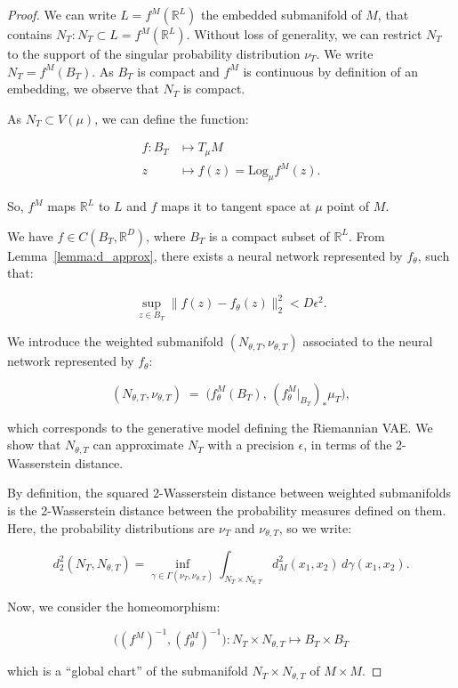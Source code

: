 \documentclass{article}
\begin{document}
\begin{proof}
We can write $L = f^M(\mathbb{R}^L)$ the embedded submanifold of $M$, that contains $N_T: N_T \subset L = f^M(\mathbb{R}^L)$.
Without loss of generality, we can restrict $N_T$ to the support of the singular probability distribution $\nu_T$.
We write $N_T = f^M(B_T)$. As $B_T$ is compact and $f^M$ is continuous by definition of an embedding, we observe that
$N_T$ is compact.

As $N_T\subset V(\mu)$, we can define the function:

\[
\begin{aligned}
f\colon B_T &\mapsto T_\mu M\\
z &\mapsto f(z) = \mathrm{Log}_\mu f^M(z).
\end{aligned}
\]


So, $f^M$ maps $\mathbb{R}^L$ to $L$ and $f$ maps it to tangent space at $\mu$ point of $M$.

We have $f \in C(B_T,\mathbb{R}^D)$, where $B_T$ is a compact subset of $\mathbb{R}^L$. From Lemma~\ref{lemma:d_approx}, there exists 
a neural network represented by $f_\theta$, such that:

\[
\sup_{z \in B_T} \| f(z) - f_\theta(z) \|_2^2 < D\epsilon^2.
\]

We introduce the weighted submanifold $(N_{\theta,T},\nu_{\theta,T})$ associated to the neural network 
represented by $f_\theta$:

\[
(N_{\theta,T},\nu_{\theta,T}) \;=\;\bigl(f^M_\theta(B_T),\, (f^M_{\theta}|_{B_T})_* \mu_T\bigr),
\]

which corresponds to the generative model defining the Riemannian VAE. We show that $N_{\theta,T}$ can approximate $N_T$
with a precision $\epsilon$, in terms of the 2-Wasserstein distance.

By definition, the squared 2-Wasserstein distance between weighted submanifolds is the 2-Wasserstein distance between 
the probability measures defined on them. Here, the probability distributions are $\nu_T$ and $\nu_{\theta,T}$, so we
write:

\[
    d_2^2(N_T,N_{\theta,T}) =
        \inf_{\gamma \in \Gamma(\nu_T, \nu_{\theta,T})}
        \int_{N_T \times N_{\theta,T}}
        d_M^2(x_1, x_2) \, d\gamma(x_1, x_2).
\]

Now, we consider the homeomorphism:

\[
\bigl((f^M)^{-1}, (f^M_\theta)^{-1}\bigr) : N_T \times N_{\theta,T} \mapsto B_T \times B_T
\]

which is a “global chart” of the submanifold $N_T \times N_{\theta,T}$ of $M \times M$.


\end{proof}
\end{document}
